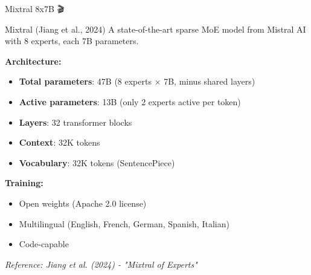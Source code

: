 \documentclass[aspectratio=169]{beamer}
\begin{document}
\begin{frame}[shrink=10]{Mixtral 8x7B 🎬}
\begin{block}{Mixtral (Jiang et al., 2024)}
A state-of-the-art sparse MoE model from Mistral AI with 8 experts, each 7B parameters.
\end{block}

\vspace{0.5em}

\textbf{Architecture:}
\begin{itemize}\setlength{\itemsep}{0pt}
    \item \textbf{Total parameters}: 47B (8 experts × 7B, minus shared layers)
    \item \textbf{Active parameters}: 13B (only 2 experts active per token)
    \item \textbf{Layers}: 32 transformer blocks
    \item \textbf{Context}: 32K tokens
    \item \textbf{Vocabulary}: 32K tokens (SentencePiece)
\end{itemize}

\vspace{0.5em}

\textbf{Training:}
\begin{itemize}\setlength{\itemsep}{0pt}
    \item Open weights (Apache 2.0 license)
    \item Multilingual (English, French, German, Spanish, Italian)
    \item Code-capable
\end{itemize}

\vspace{0.3em}
\small
\textit{Reference: Jiang et al. (2024) - "Mixtral of Experts"}
\end{frame}
\end{document}
